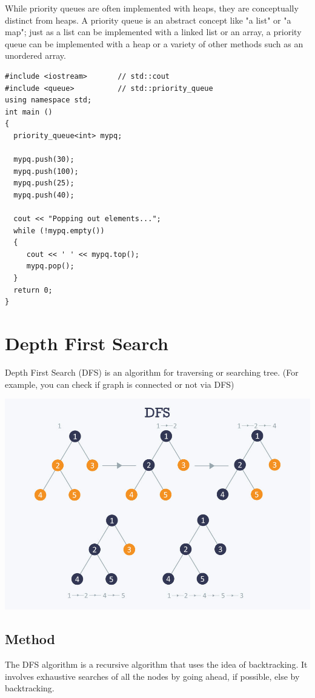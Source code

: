 \documentclass[12pt]{article}
\begin{document}
    While priority queues are often implemented with heaps, they are conceptually distinct from heaps. A priority queue is an abstract concept like "a list" or "a map"; just as a list can be implemented with a linked list or an array, a priority queue can be implemented with a heap or a variety of other methods such as an unordered array. \cite{9}
    \begin{verbatim}
#include <iostream>       // std::cout
#include <queue>          // std::priority_queue
using namespace std;
int main ()
{
  priority_queue<int> mypq;

  mypq.push(30);
  mypq.push(100);
  mypq.push(25);
  mypq.push(40);

  cout << "Popping out elements...";
  while (!mypq.empty())
  {
     cout << ' ' << mypq.top();
     mypq.pop();
  }
  return 0;
}
\end{verbatim}

    

\section{Depth First Search}

    Depth First Search (DFS) is an algorithm for traversing or searching tree. (For example, you can check if graph is connected or not via DFS) 

     \includegraphics[width=\linewidth /3*2]{9fa1119.jpg}
    
    \subsection{Method}
        The DFS algorithm is a recursive algorithm that uses the idea of backtracking. It involves exhaustive searches of all the nodes by going ahead, if possible, else by backtracking.
\end{document}
